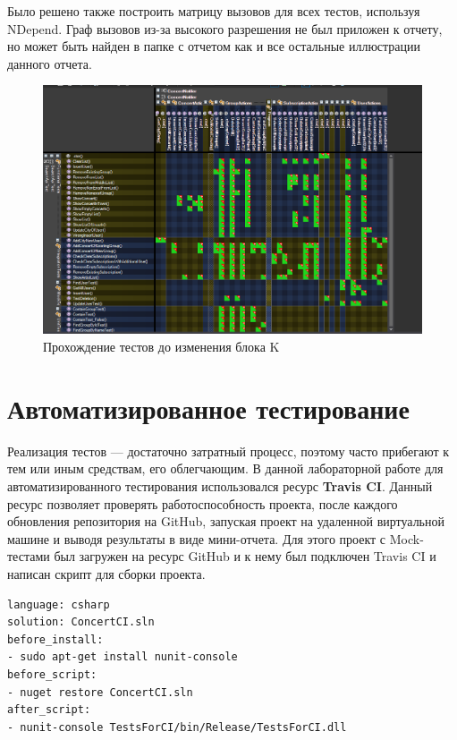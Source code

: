 Было решено также построить матрицу вызовов для всех тестов, используя NDepend. 
Граф вызовов из-за высокого разрешения не был приложен к отчету, но может быть найден в папке с отчетом как и все остальные иллюстрации данного отчета.
\begin{figure}
	\includegraphics[scale=0.63]{MatrixDep.PNG}
	\caption{Прохождение тестов до изменения блока K}
	\label{image:complex-dep}
\end{figure}



\chapter{Автоматизированное тестирование}
Реализация тестов — достаточно затратный процесс, поэтому часто прибегают к тем
или иным средствам, его облегчающим. В данной лабораторной работе для автоматизированного тестирования использовался ресурс \textbf{Travis CI}. Данный ресурс позволяет проверять работоспособность проекта, после каждого обновления репозитория на GitHub, запуская проект на удаленной виртуальной машине и выводя результаты в виде мини-отчета. 
Для этого проект с Mock-тестами был загружен на ресурс GitHub и к нему был подключен Travis CI и написан скрипт для сборки проекта.

\begin{lstlisting}[caption={Сценарий сборки для Travis CI}, label={lst:set-info}]
language: csharp
solution: ConcertCI.sln
before_install:
- sudo apt-get install nunit-console
before_script:
- nuget restore ConcertCI.sln
after_script:
- nunit-console TestsForCI/bin/Release/TestsForCI.dll 
\end{lstlisting}

